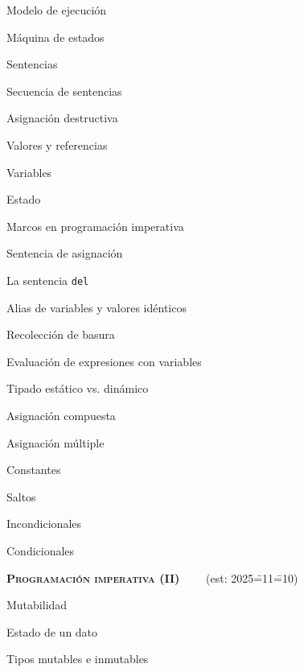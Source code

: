 \begin{longenum}
\begin{longenum}
        \item Modelo de ejecución
        \begin{longenum}
            \item Máquina de estados
            \item Sentencias
            \item Secuencia de sentencias
        \end{longenum}
        \item Asignación destructiva
        \begin{longenum}
            \item Valores y referencias
            \item Variables
            \item Estado
            \item Marcos en programación imperativa
            \item Sentencia de asignación
            \item La sentencia \texttt{del}
            \item Alias de variables y valores idénticos
            \item Recolección de basura
            \item Evaluación de expresiones con variables
            \item Tipado estático vs. dinámico
            \item Asignación compuesta
            \item Asignación múltiple
            \item Constantes
        \end{longenum}
        \item Saltos
        \begin{longenum}
            \item Incondicionales
            \item Condicionales
        \end{longenum}
    \end{longenum}
    \item \textbf{\textsc{Programación imperativa (II)}} \ \ \ \ (est: 2025\==11\==10)
    \begin{longenum}
        \item Mutabilidad
        \begin{longenum}
            \item Estado de un dato
            \item Tipos mutables e inmutables
            \begin{longenum}

\end{longenum}
\end{longenum}
\end{longenum}
\end{longenum}
